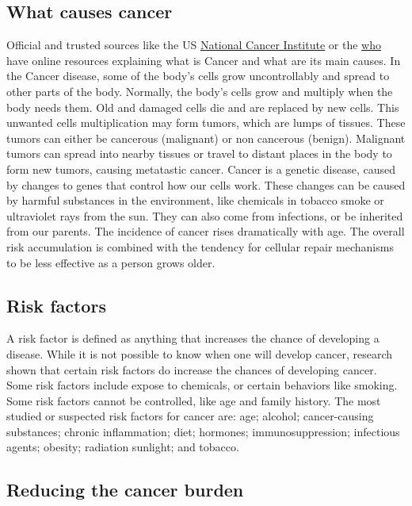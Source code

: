 \subsection{What causes cancer}

Official and trusted sources like the US
\href{https://www.cancer.gov/about-cancer/understanding/what-is-cancer}{National
    Cancer Institute} or the
\href{https://www.who.int/news-room/fact-sheets/detail/cancer}{\acl{who}} have
online resources explaining what is Cancer and what are its main causes. In the
Cancer disease, some of the body's cells grow uncontrollably and spread to other
parts of the body. Normally, the body's cells grow and multiply when the body
needs them. Old and damaged cells die and are replaced by new cells. This
unwanted cells multiplication may form tumors, which are lumps of tissues. These
tumors can either be cancerous (malignant) or non cancerous (benign). Malignant
tumors can spread into nearby tissues or travel to distant places in the body to
form new tumors, causing metatastic cancer. Cancer is a genetic disease, caused
by changes to genes that control how our cells work. These changes can be caused
by harmful substances in the environment, like chemicals in tobacco smoke or
ultraviolet rays from the sun. They can also come from infections, or be
inherited from our parents. The incidence of cancer rises dramatically with age.
The overall risk accumulation is combined with the tendency for cellular repair
mechanisms to be less effective as a person grows older.

\subsection{Risk factors}

A risk factor is defined as anything that increases the chance of developing a
disease. While it is not possible to know when one will develop cancer, research
shown that certain risk factors do increase the chances of developing cancer.
Some risk factors include expose to chemicals, or certain behaviors like
smoking. Some risk factors cannot be controlled, like age and family history.
The most studied or suspected risk factors for cancer are: age; alcohol;
cancer-causing substances; chronic inflammation; diet; hormones;
immunosuppression; infectious agents; obesity; radiation sunlight; and tobacco.

\subsection{Reducing the cancer burden}


